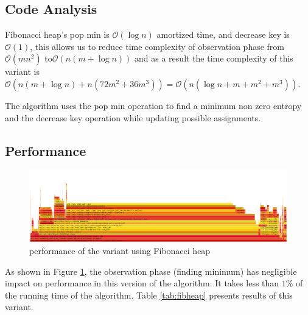 \documentclass[shortabstract, english, inz]{iithesis}
\begin{document}
\subsection{Code Analysis}
Fibonacci heap's pop min is \(\mathcal{O}(\log{n})\) amortized time, and decrease key is \(\mathcal{O}(1)\), this allows us to reduce time complexity of observation phase from \(\mathcal{O}(mn^2)\) to\break\(\mathcal{O}(n(m + \log{n}))\) and as a result the time complexity of this variant is \break\(\mathcal{O}(n(m + \log{n}) + n(72m^2 + 36m^3)) = \mathcal{O}(n(\log{n} + m + m^2 + m^3))\).

The algorithm uses the pop min operation to find a minimum non zero entropy and the decrease key operation while updating possible assignments.

\subsection{Performance}
\begin{figure}[H]
\centering
\includegraphics[width=1\textwidth, angle=0]{images/fibheap_flamegraph.png}
\caption{performance of the variant using Fibonacci heap}
\label{fig:fibheap_flamegraph}
\end{figure}
As shown in Figure \ref{fig:fibheap_flamegraph}, the observation phase (finding minimum) has negligible impact on performance in this version of the algorithm. It takes less than \(1\%\)  of the running time of the algorithm. Table \ref{tab:fibheap} presents results of this variant.
\end{document}
